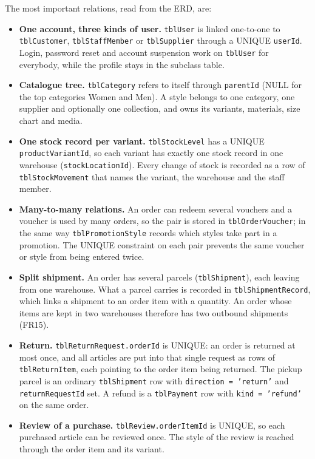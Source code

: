 The most important relations, read from the ERD, are:
\begin{itemize}
  \item \textbf{One account, three kinds of user.} \texttt{tblUser} is linked one-to-one to \texttt{tblCustomer}, \texttt{tblStaffMember} or \texttt{tblSupplier} through a UNIQUE \texttt{userId}. Login, password reset and account suspension work on \texttt{tblUser} for everybody, while the profile stays in the subclass table.
  \item \textbf{Catalogue tree.} \texttt{tblCategory} refers to itself through \texttt{parentId} (NULL for the top categories Women and Men). A style belongs to one category, one supplier and optionally one collection, and owns its variants, materials, size chart and media.
  \item \textbf{One stock record per variant.} \texttt{tblStockLevel} has a UNIQUE \texttt{productVariantId}, so each variant has exactly one stock record in one warehouse (\texttt{stockLocationId}). Every change of stock is recorded as a row of \texttt{tblStockMovement} that names the variant, the warehouse and the staff member.
  \item \textbf{Many-to-many relations.} An order can redeem several vouchers and a voucher is used by many orders, so the pair is stored in \texttt{tblOrderVoucher}; in the same way \texttt{tblPromotionStyle} records which styles take part in a promotion. The UNIQUE constraint on each pair prevents the same voucher or style from being entered twice.
  \item \textbf{Split shipment.} An order has several parcels (\texttt{tblShipment}), each leaving from one warehouse. What a parcel carries is recorded in \texttt{tblShipmentRecord}, which links a shipment to an order item with a quantity. An order whose items are kept in two warehouses therefore has two outbound shipments (FR15).
  \item \textbf{Return.} \texttt{tblReturnRequest.\allowbreak orderId} is UNIQUE: an order is returned at most once, and all articles are put into that single request as rows of \texttt{tblReturnItem}, each pointing to the order item being returned. The pickup parcel is an ordinary \texttt{tblShipment} row with \texttt{direction = 'return'} and \texttt{returnRequestId} set. A refund is a \texttt{tblPayment} row with \texttt{kind = 'refund'} on the same order.
  \item \textbf{Review of a purchase.} \texttt{tblReview.\allowbreak orderItemId} is UNIQUE, so each purchased article can be reviewed once. The style of the review is reached through the order item and its variant.
\end{itemize}

